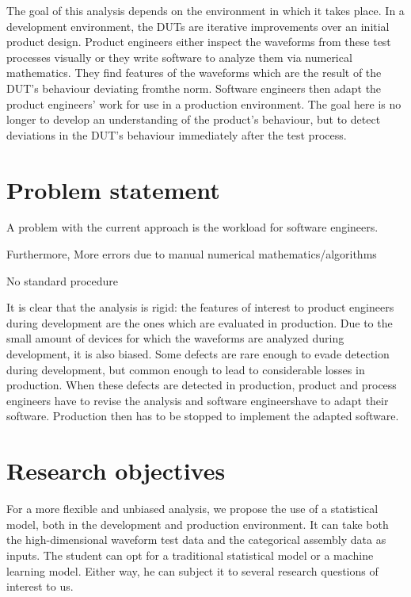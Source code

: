 The goal of this analysis depends on the environment in which it takes place.
In a development environment, the DUTs are iterative improvements over an initial product design.
Product engineers either inspect the waveforms from these test processes visually or they write software to analyze them via numerical mathematics. They find features of the waveforms which are the result of the DUT’s behaviour deviating fromthe norm. Software engineers then adapt the product engineers’ work for use in a production environment.
The goal here is no longer to develop an understanding of the product’s behaviour, but to detect deviations in the DUT’s behaviour immediately after the test process.


\section{Problem statement}

A problem with the current approach is the workload for software engineers.

Furthermore, More errors due to manual numerical mathematics/algorithms

No standard procedure

It is clear that the analysis is rigid: the features of interest to product engineers during development are the ones which are evaluated in production.
Due to the small amount of devices for which the waveforms are analyzed during development, it is also biased.
Some defects are rare enough to evade detection during development, but common enough to lead to considerable losses in production.
When these defects are detected in production, product and process engineers have to revise the analysis and software engineershave to adapt their software.
Production then has to be stopped to implement the adapted software.

\section{Research objectives}

For a more flexible and unbiased analysis, we propose the use of a statistical model, both in the development
and production environment. It can take both the high-dimensional waveform test data and the categorical
assembly data as inputs. The student can opt for a traditional statistical model or a machine learning model.
Either way, he can subject it to several research questions of interest to us.

